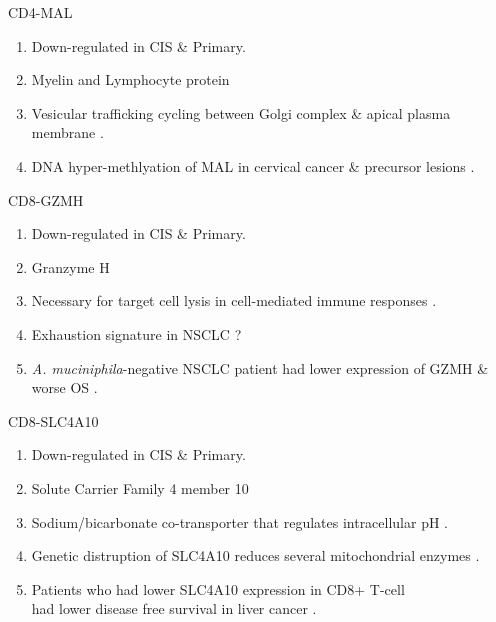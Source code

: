 \documentclass{beamer}
\begin{document}
\begin{frame}[allowframebreaks]
        \begin{block}{CD4-MAL}
            \begin{enumerate}
                \item Down-regulated in CIS \& Primary.
                \item Myelin and Lymphocyte protein
                \item Vesicular trafficking cycling between Golgi complex \& apical plasma membrane \cite{MAL-1}.
                \item DNA hyper-methlyation of MAL in cervical cancer \& precursor lesions \cite{MAL-2}.
            \end{enumerate}
        \end{block}

        \begin{block}{CD8-GZMH}
            \begin{enumerate}
                \item Down-regulated in CIS \& Primary.
                \item Granzyme H
                \item Necessary for target cell lysis in cell-mediated immune responses \cite{GZMH-1, GZMH-2}.
                \item Exhaustion signature in NSCLC \cite{GZMH-3} ?
                \item \textit{A. muciniphila}-negative NSCLC patient had lower expression of GZMH \& worse OS \cite{GZMH-4}.
            \end{enumerate}
        \end{block}

        \begin{block}{CD8-SLC4A10}
            \begin{enumerate}
                \item Down-regulated in CIS \& Primary.
                \item Solute Carrier Family 4 member 10
                \item Sodium/bicarbonate co-transporter that regulates intracellular pH \cite{SLC4A10-1}.
                \item Genetic distruption of SLC4A10 reduces several mitochondrial enzymes \cite{SLC4A10-2}.
                \item Patients who had lower SLC4A10 expression in CD8+ T-cell \\
                    had lower disease free survival in liver cancer \cite{SLC4A10-3}.
            \end{enumerate}
        \end{block}


\end{frame}
\end{document}
